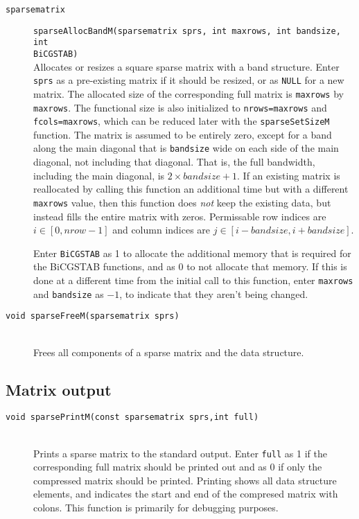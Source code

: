 \documentclass[11pt]{article}
\newcommand {\ttt} {\texttt}
\begin{document}
\begin{description}


\item[\ttt{sparsematrix}]
\ttt{sparseAllocBandM(sparsematrix sprs, int maxrows, int bandsize, int \\ BiCGSTAB)}
\hfill \\
Allocates or resizes a square sparse matrix with a band structure. Enter \ttt{sprs} as a pre-existing matrix if it should be resized, or as \ttt{NULL} for a new matrix. The allocated size of the corresponding full matrix is \ttt{maxrows} by \ttt{maxrows}. The functional size is also initialized to \ttt{nrows=maxrows} and \ttt{fcols=maxrows}, which can be reduced later with the \ttt{sparseSetSizeM} function. The matrix is assumed to be entirely zero, except for a band along the main diagonal that is \ttt{bandsize} wide on each side of the main diagonal, not including that diagonal. That is, the full bandwidth, including the main diagonal, is $2 \times bandsize+1$. If an existing matrix is reallocated by calling this function an additional time but with a different \ttt{maxrows} value, then this function does \textit{not} keep the existing data, but instead fills the entire matrix with zeros. Permissable row indices are $i \in [0,nrow-1]$ and column indices are $j \in [i-bandsize,i+bandsize]$.

Enter \ttt{BiCGSTAB} as 1 to allocate the additional memory that is required for the BiCGSTAB functions, and as 0 to not allocate that memory. If this is done at a different time from the initial call to this function, enter \ttt{maxrows} and \ttt{bandsize} as $-1$, to indicate that they aren't being changed.

\item[\ttt{void sparseFreeM(sparsematrix sprs)}]
\hfill \\
Frees all components of a sparse matrix and the data structure.

\end{description}

\subsection{Matrix output}

\begin{description}

\item[\ttt{void sparsePrintM(const sparsematrix sprs,int full)}]
\hfill \\
Prints a sparse matrix to the standard output. Enter \ttt{full} as 1 if the corresponding full matrix should be printed out and as 0 if only the compressed matrix should be printed. Printing shows all data structure elements, and indicates the start and end of the compresed matrix with colons. This function is primarily for debugging purposes.

\end{description}
\end{document}
